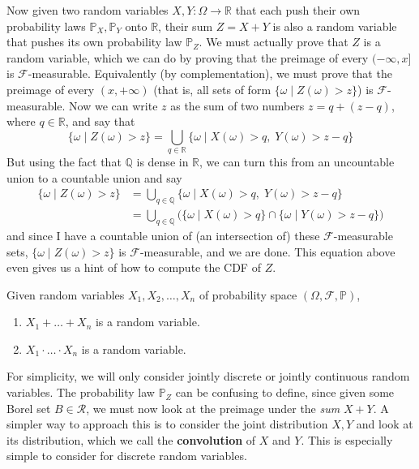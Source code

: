\documentclass{article}
\begin{document}
      Now given two random variables $X, Y: \Omega \rightarrow \mathbb{R}$ that each push their own probability laws $\mathbb{P}_X, \mathbb{P}_Y$ onto $\mathbb{R}$, their sum $Z = X + Y$ is also a random variable that pushes its own probability law $\mathbb{P}_Z$. We must actually prove that $Z$ is a random variable, which we can do by proving that the preimage of every $(-\infty, x]$ is $\mathcal{F}$-measurable. Equivalently (by complementation), we must prove that the preimage of every $(x, +\infty)$ (that is, all sets of form $\{ \omega \mid Z(\omega) > z\}$) is $\mathcal{F}$-measurable. Now we can write $z$ as the sum of two numbers $z = q + (z - q)$, where $q \in \mathbb{R}$, and say that 
      \begin{equation}
        \{ \omega \mid Z(\omega) > z\} = \bigcup_{q \in \mathbb{R}} \{ \omega \mid X (\omega) > q , \; Y(\omega) > z - q\}
      \end{equation}
      But using the fact that $\mathbb{Q}$ is dense in $\mathbb{R}$, we can turn this from an uncountable union to a countable union and say 
      \begin{align}
        \{ \omega \mid Z(\omega) > z\} & = \bigcup_{q \in \mathbb{Q}} \{ \omega \mid X (\omega) > q , \; Y(\omega) > z - q\} \\
        & = \bigcup_{q \in \mathbb{Q}} \big( \{\omega \mid X(\omega) > q\} \cap \{ \omega \mid Y(\omega) > z - q\} \big) 
      \end{align}
      and since I have a countable union of (an intersection of) these $\mathcal{F}$-measurable sets, $\{ \omega \mid Z(\omega) > z\}$ is $\mathcal{F}$-measurable, and we are done. This equation above even gives us a hint of how to compute the CDF of $Z$. 

      \begin{theorem}
        Given random variables $X_1, X_2, \ldots, X_n$ of probability space $(\Omega, \mathcal{F}, \mathbb{P})$, 
        \begin{enumerate}
          \item $X_1 + \ldots + X_n$ is a random variable.
          \item $X_1 \cdot \ldots \cdot X_n$ is a random variable. 
        \end{enumerate}
      \end{theorem}

      For simplicity, we will only consider jointly discrete or jointly continuous random variables. The probability law $\mathbb{P}_Z$ can be confusing to define, since given some Borel set $B \in \mathcal{R}$, we must now look at the preimage under the \textit{sum} $X + Y$. A simpler way to approach this is to consider the joint distribution $X, Y$ and look at its distribution, which we call the \textbf{convolution} of $X$ and $Y$. This is especially simple to consider for discrete random variables. 
\end{document}
